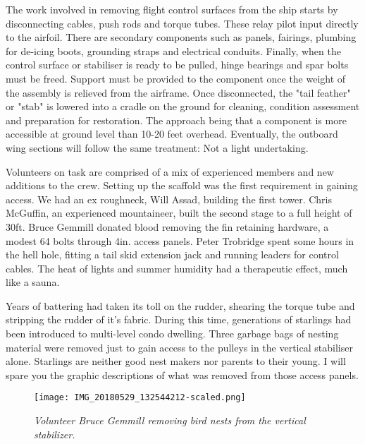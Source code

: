The work involved in removing flight control surfaces from the ship starts by
disconnecting cables, push rods and torque tubes. These relay pilot input
directly to the airfoil. There are secondary components such as panels,
fairings, plumbing for de-icing boots, grounding straps and electrical conduits.
Finally, when the control surface or stabiliser is ready to be pulled, hinge
bearings and spar bolts must be freed. Support must be provided to the component
once the weight of the assembly is relieved from the airframe. Once
disconnected, the "tail feather" or "stab" is lowered into a cradle on the
ground for cleaning, condition assessment and preparation for restoration. The
approach being that a component is more accessible at ground level than 10-20
feet overhead. Eventually, the outboard wing sections will follow the same
treatment: Not a light undertaking. 

Volunteers on task are comprised of a mix of experienced members and new
additions to the crew. Setting up the scaffold was the first requirement in
gaining access. We had an ex roughneck, Will Assad, building the first tower.
Chris McGuffin, an experienced mountaineer, built the second stage to a full
height of 30ft. Bruce Gemmill donated blood removing the fin retaining hardware,
a modest 64 bolts through 4in. access panels. Peter Trobridge spent some hours
in the hell hole, fitting a tail skid extension jack and running leaders for
control cables. The heat of lights and summer humidity had a therapeutic effect,
much like a sauna. 

Years of battering had taken its toll on the rudder, shearing the torque tube
and stripping the rudder of it's fabric. During this time, generations of
starlings had been introduced to multi-level condo dwelling. Three garbage bags
of nesting material were removed just to gain access to the pulleys in the
vertical stabiliser alone. Starlings are neither good nest makers nor parents to
their young. I will spare you the graphic descriptions of what was removed from
those access panels. 

\begin{figure}[httb]
   \vspace{2em}
   \centering
   \texttt{[image: IMG\_20180529\_132544212-scaled.png]}
   \caption*{\small \em Volunteer Bruce Gemmill removing bird nests from the vertical stabilizer.}
   \label{fig:stab-one}
\end{figure}

